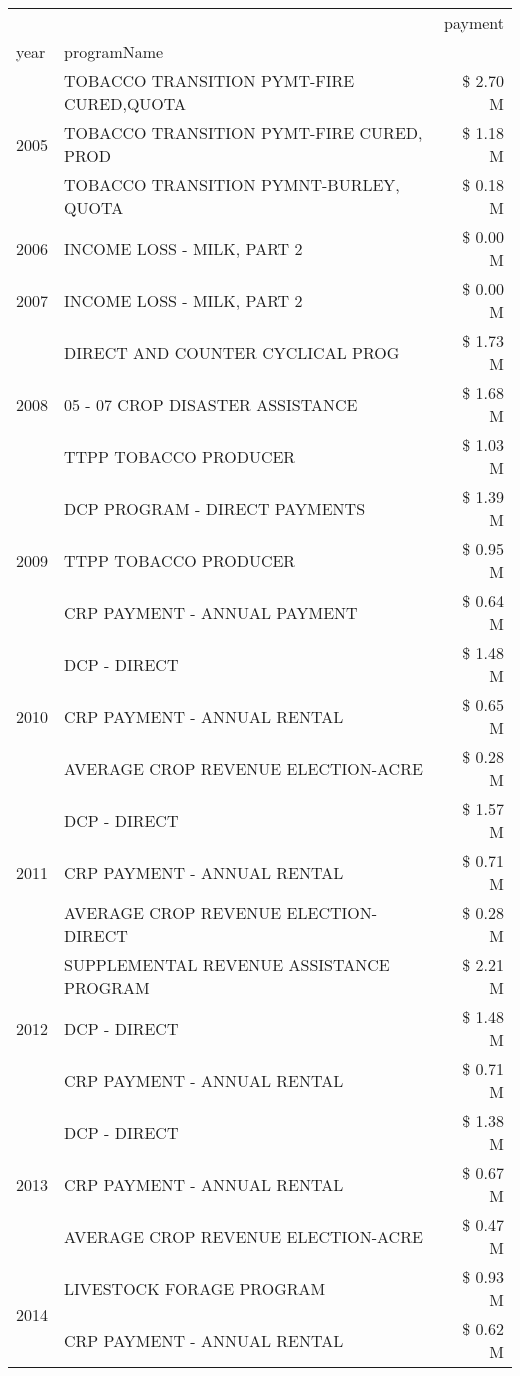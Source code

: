 \begin{tabular}{llr}
\toprule
 &  & payment \\
year & programName &  \\
\midrule
\multirow[t]{3}{*}{2005} & TOBACCO TRANSITION PYMT-FIRE CURED,QUOTA & \$ 2.70 M \\
 & TOBACCO TRANSITION PYMT-FIRE CURED, PROD & \$ 1.18 M \\
 & TOBACCO TRANSITION PYMNT-BURLEY, QUOTA & \$ 0.18 M \\
\cline{1-3}
2006 & INCOME LOSS - MILK, PART 2 & \$ 0.00 M \\
\cline{1-3}
2007 & INCOME LOSS - MILK, PART 2 & \$ 0.00 M \\
\cline{1-3}
\multirow[t]{3}{*}{2008} & DIRECT AND COUNTER CYCLICAL PROG & \$ 1.73 M \\
 & 05 - 07 CROP DISASTER ASSISTANCE & \$ 1.68 M \\
 & TTPP TOBACCO PRODUCER & \$ 1.03 M \\
\cline{1-3}
\multirow[t]{3}{*}{2009} & DCP PROGRAM - DIRECT PAYMENTS & \$ 1.39 M \\
 & TTPP TOBACCO PRODUCER & \$ 0.95 M \\
 & CRP PAYMENT - ANNUAL PAYMENT & \$ 0.64 M \\
\cline{1-3}
\multirow[t]{3}{*}{2010} & DCP - DIRECT & \$ 1.48 M \\
 & CRP PAYMENT - ANNUAL RENTAL & \$ 0.65 M \\
 & AVERAGE CROP REVENUE ELECTION-ACRE & \$ 0.28 M \\
\cline{1-3}
\multirow[t]{3}{*}{2011} & DCP - DIRECT & \$ 1.57 M \\
 & CRP PAYMENT - ANNUAL RENTAL & \$ 0.71 M \\
 & AVERAGE CROP REVENUE ELECTION-DIRECT & \$ 0.28 M \\
\cline{1-3}
\multirow[t]{3}{*}{2012} & SUPPLEMENTAL REVENUE ASSISTANCE PROGRAM & \$ 2.21 M \\
 & DCP - DIRECT & \$ 1.48 M \\
 & CRP PAYMENT - ANNUAL RENTAL & \$ 0.71 M \\
\cline{1-3}
\multirow[t]{3}{*}{2013} & DCP - DIRECT & \$ 1.38 M \\
 & CRP PAYMENT - ANNUAL RENTAL & \$ 0.67 M \\
 & AVERAGE CROP REVENUE ELECTION-ACRE & \$ 0.47 M \\
\cline{1-3}
\multirow[t]{3}{*}{2014} & LIVESTOCK FORAGE PROGRAM & \$ 0.93 M \\
 & CRP PAYMENT - ANNUAL RENTAL & \$ 0.62 M \\

\end{tabular}
